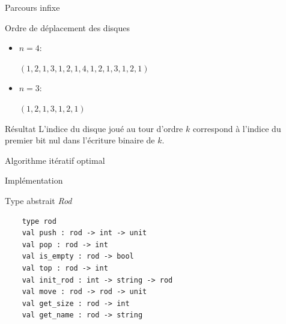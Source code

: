 \documentclass[usenames,dvipsnames,serif,14pt]{beamer}%
\begin{document}
\begin{frame}{Parcours infixe}
  \begin{block}{Ordre de déplacement des disques}
    \begin{itemize}
    \item
    $n=4$:
      \begin{center}
        $(1, 2, 1, 3, 1, 2, 1, 4, 1, 2, 1, 3, 1, 2, 1)$
      \end{center}
    \item
    $n=3$:
      \begin{center}
        $(1, 2, 1, 3, 1, 2, 1)$
      \end{center}
    \end{itemize}
  \end{block}
  \begin{block}{Résultat}
    \justifying
    L'indice du disque joué au tour d'ordre $k$
    correspond à l'indice du premier bit nul dans l'écriture binaire de $k$.
  \end{block}
\end{frame}

\begin{frame}{Algorithme itératif optimal}
  \begin{center}
  \end{center}
\end{frame}

\begin{frame}[fragile]{Implémentation}
  \begin{block}{Type abstrait \textit{Rod}}
    \begin{verbatim}
    type rod
    val push : rod -> int -> unit
    val pop : rod -> int
    val is_empty : rod -> bool
    val top : rod -> int
    val init_rod : int -> string -> rod
    val move : rod -> rod -> unit
    val get_size : rod -> int
    val get_name : rod -> string
    \end{verbatim}
  \end{block}
\end{frame}
\end{document}

